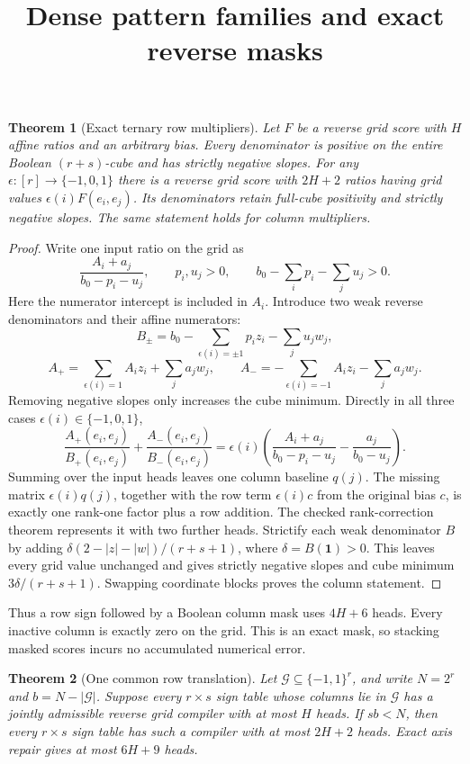 \documentclass[11pt]{article}
\newtheorem{theorem}{Theorem}
\begin{document}
\title{Dense pattern families and exact reverse masks}
\author{}
\date{}
\maketitle

\begin{theorem}[Exact ternary row multipliers]
Let $F$ be a reverse grid score with $H$ affine ratios and an arbitrary
bias. Every denominator is positive on the entire Boolean $(r+s)$-cube
and has strictly negative slopes. For any
$\epsilon:[r]\to\{-1,0,1\}$ there is a reverse grid score with
$2H+2$ ratios having grid values $\epsilon(i)F(e_i,e_j)$.
Its denominators retain full-cube positivity and strictly negative slopes.
The same statement holds for column multipliers.
\end{theorem}

\begin{proof}
Write one input ratio on the grid as
\[
 \frac{A_i+a_j}{b_0-p_i-u_j},\qquad p_i,u_j>0,
 \qquad b_0-\sum_i p_i-\sum_j u_j>0.
\]
Here the numerator intercept is included in $A_i$. Introduce two weak
reverse denominators and their affine numerators:
\[
 B_\pm=b_0-\sum_{\epsilon(i)=\pm1}p_i z_i-\sum_j u_jw_j,
\]
\[
 A_+=\sum_{\epsilon(i)=1}A_i z_i+\sum_j a_jw_j,
 \qquad
 A_-=-\sum_{\epsilon(i)=-1}A_i z_i-\sum_j a_jw_j.
\]
Removing negative slopes only increases the cube minimum. Directly in
all three cases $\epsilon(i)\in\{-1,0,1\}$,
\[
 \frac{A_+(e_i,e_j)}{B_+(e_i,e_j)}+
 \frac{A_-(e_i,e_j)}{B_-(e_i,e_j)}
 =\epsilon(i)\left(\frac{A_i+a_j}{b_0-p_i-u_j}
                         -\frac{a_j}{b_0-u_j}\right).
\]
Summing over the input heads leaves one column baseline $q(j)$.
The missing matrix $\epsilon(i)q(j)$, together with the row term
$\epsilon(i)c$ from the original bias $c$, is exactly one rank-one
factor plus a row addition. The checked rank-correction theorem
represents it with two further heads. Strictify each weak denominator
$B$ by adding
$\delta(2-|z|-|w|)/(r+s+1)$, where
$\delta=B(\boldsymbol1)>0$. This leaves every grid value unchanged and
gives strictly negative slopes and cube minimum $3\delta/(r+s+1)$.
Swapping coordinate blocks proves the column statement.
\end{proof}

Thus a row sign followed by a Boolean column mask uses $4H+6$ heads.
Every inactive column is exactly zero on the grid. This is an exact
mask, so stacking masked scores incurs no accumulated numerical error.

\begin{theorem}[One common row translation]
Let $\mathcal G\subseteq\{-1,1\}^r$, and write
$N=2^r$ and $b=N-|\mathcal G|$. Suppose every $r\times s$ sign table
whose columns lie in $\mathcal G$ has a jointly admissible reverse grid
compiler with at most $H$ heads. If $sb<N$, then every $r\times s$
sign table has such a compiler with at most $2H+2$ heads. Exact axis
repair gives at most $6H+9$ heads.
\end{theorem}
\end{document}
